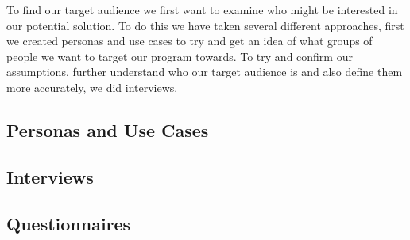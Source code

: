 To find our target audience we first want to examine who might be interested in our potential solution. To do this we have taken several different approaches, first we created personas and use cases to try and get an idea of what groups of people we want to target our program towards. To try and confirm our assumptions, further understand who our target audience is and also define them more accurately, we did interviews.
\subsection{Personas and Use Cases}
\label{UseCases}

\subsection{Interviews}
\label{AudInterview}

\subsection{Questionnaires}
\label{AudQuestionnaire}
